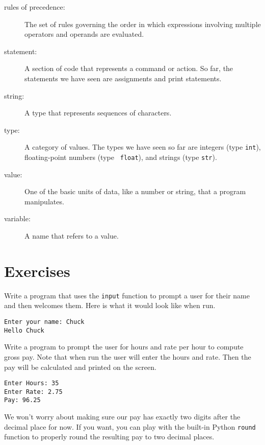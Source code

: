 \begin{description}
\item[rules of precedence:]  The set of rules governing the order in which
expressions involving multiple operators and operands are evaluated.

\item[statement:]  A section of code that represents a command or action.  So
far, the statements we have seen are assignments and print statements.

\item[string:] A type that represents sequences of characters.

\item[type:] A category of values.  The types we have seen so far
are integers (type {\tt int}), floating-point numbers (type {\tt
float}), and strings (type {\tt str}).

\item[value:]  One of the basic units of data, like a number or string, 
that a program manipulates.

\item[variable:]  A name that refers to a value.

\end{description}

\section{Exercises}

\begin{ex}
Write a program that uses the \verb"input" function to prompt a user for their name 
and then welcomes them. Here is what it would look like when run.

\begin{verbatim}
Enter your name: Chuck
Hello Chuck
\end{verbatim}

\end{ex}

\begin{ex}\label{exCh2HourRate}
Write a program to prompt the user for hours and rate per hour to compute
gross pay. Note that when run the user will enter the hours and rate. Then the pay will be calculated and printed on the screen.
\begin{verbatim}
Enter Hours: 35
Enter Rate: 2.75
Pay: 96.25
\end{verbatim}
\end{ex}
%
We won't worry about making sure our pay has exactly two digits after
the decimal place for now.  If you want, you can play with the 
built-in Python {\tt round} function to properly round the resulting pay
to two decimal places.

